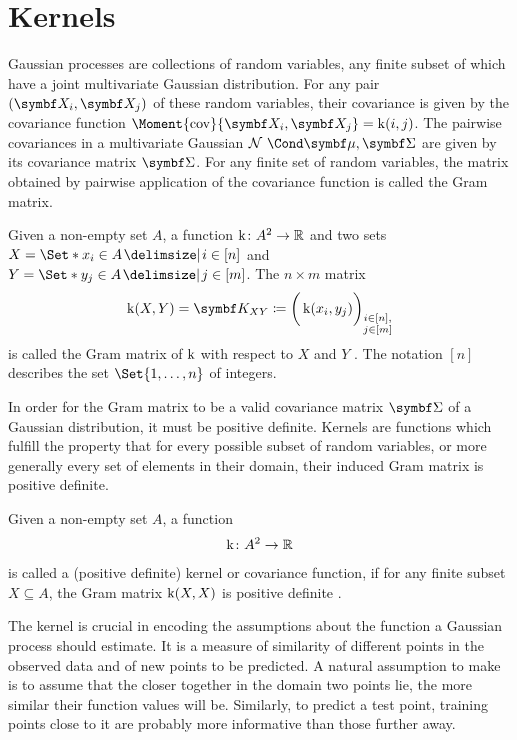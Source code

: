 \section{Kernels}
Gaussian processes are collections of random variables, any finite subset of which have a joint multivariate Gaussian distribution.
For any pair $(\rv{X_i}, \mat{X_j})$ of these random variables, their covariance is given by the covariance function $\Moment{\cov}{\rv{X_i}, \rv{X_j}} = \K(i, j)$.
The pairwise covariances in a multivariate Gaussian $\Gaussian{\mat{\mu}, \mat{\Sigma}}$ are given by its covariance matrix $\mat{\Sigma}$.
For any finite set of random variables, the matrix obtained by pairwise application of the covariance function is called the Gram matrix.
\begin{definition}
    Given a non-empty set $A$, a function $\operatorname{k} \colon A^2 \to \mathbb{R}$ and two sets $X = \Set*{x_i \in A \with i \in [n]}$ and $Y = \Set*{y_j \in A \with j \in [m]}$.
    The $n \times m$ matrix
    \begin{align}
        \K(X, Y) = \mat{K_{XY}} \coloneqq \bigg( \K(x_i, y_j) \bigg)_{\substack{i \in [n], \\ j \in [m]}}
    \end{align}
    is called the Gram matrix of $\operatorname{k}$ with respect to $X$ and $Y$ \cite{scholkopf_learning_2002}.
    The notation $[n]$ describes the set $\Set{1, \dots, n}$ of integers.
\end{definition}
In order for the Gram matrix to be a valid covariance matrix $\mat{\Sigma}$ of a Gaussian distribution, it must be positive definite.
Kernels are functions which fulfill the property that for every possible subset of random variables, or more generally every set of elements in their domain, their induced Gram matrix is positive definite.
\begin{definition}[Kernel]
    Given a non-empty set $A$, a function
    \begin{align}
        \operatorname{k} \colon A^2 \to \mathbb{R}
    \end{align}
    is called a (positive definite) kernel or covariance function, if for any finite subset $X \subseteq A$, the Gram matrix $\operatorname{k}(X, X)$ is positive definite \cite{scholkopf_learning_2002}.
\end{definition}
The kernel is crucial in encoding the assumptions about the function a Gaussian process should estimate.
It is a measure of similarity of different points in the observed data and of new points to be predicted.
A natural assumption to make is to assume that the closer together in the domain two points lie, the more similar their function values will be.
Similarly, to predict a test point, training points close to it are probably more informative than those further away.

